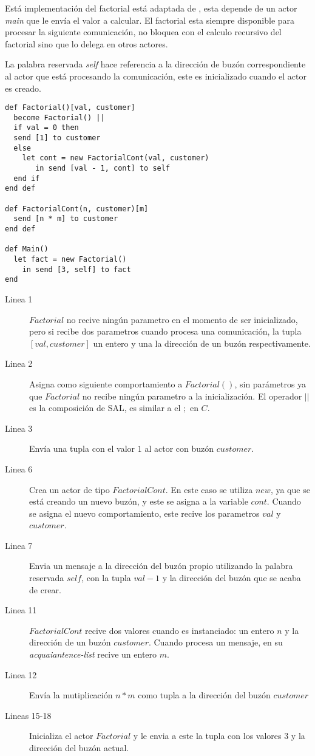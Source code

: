 Está implementación del factorial está adaptada de \cite{Agha:1986:AMC:7929}, esta
depende de un actor \textit{main} que le envía el valor a calcular. El factorial
esta siempre disponible para procesar la siguiente comunicación, no bloquea con
el calculo recursivo del factorial sino que lo delega en otros actores.

La palabra reservada \textit{self} hace referencia a la dirección de buzón
correspondiente al actor que está procesando la comunicación, este es inicializado
cuando el actor es creado.

\begin{lstlisting}[language=sal, style=simple]
def Factorial()[val, customer]
  become Factorial() ||
  if val = 0 then
  send [1] to customer
  else
    let cont = new FactorialCont(val, customer)
       in send [val - 1, cont] to self
  end if 
end def

def FactorialCont(n, customer)[m] 
  send [n * m] to customer
end def

def Main() 
  let fact = new Factorial() 
    in send [3, self] to fact
end
\end{lstlisting}

\begin{description}

\item [Linea 1] $Factorial$ no recive ningún parametro en el momento de ser inicializado, pero si recibe dos parametros cuando procesa una comunicación, la tupla $[val, customer]$ un entero y una la dirección de un buzón respectivamente.
\item [Linea 2] Asigna como siguiente comportamiento a $Factorial()$, sin parámetros ya que $Factorial$ no recibe ningún parametro a la inicialización. El operador $||$ es la composición de SAL, es similar a el $;$ en $C$. 
\item [Linea 3] Envía una tupla con el valor $1$ al actor con buzón $customer$.
\item [Linea 6] Crea un actor de tipo $FactorialCont$. En este caso se utiliza $new$, ya que se está creando un nuevo buzón, y este se asigna a la variable $cont$. Cuando se asigna el nuevo comportamiento, este recive los parametros $val$ y $customer$.
\item [Linea 7] Envia un mensaje a la dirección del buzón propio utilizando la palabra reservada $self$, con la tupla $val - 1$ y la dirección del buzón que se acaba de crear.
\item [Linea 11] $FactorialCont$ recive dos valores cuando es instanciado: un entero $n$ y la dirección de un buzón $customer$. Cuando procesa un mensaje, en su \textit{acquaiantence-list} recive un entero $m$.
\item [Linea 12] Envía la mutiplicación $n*m$ como tupla a la dirección del buzón $customer$ 
\item [Lineas 15-18] Inicializa el actor $Factorial$ y le envia a este la tupla con los valores $3$ y la dirección del buzón actual. 

\end{description}

